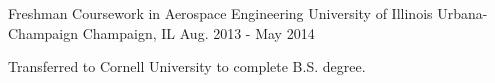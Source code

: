 \begin{cventries}

\cventry
    {Freshman Coursework in Aerospace Engineering} %
    {University of Illinois Urbana-Champaign} %
    {Champaign, IL} %
    {Aug. 2013 - May 2014} %
    {
      \begin{cvitems} %
        \item {Transferred to Cornell University to complete B.S. degree.}
      \end{cvitems}
    }    

\end{cventries}
